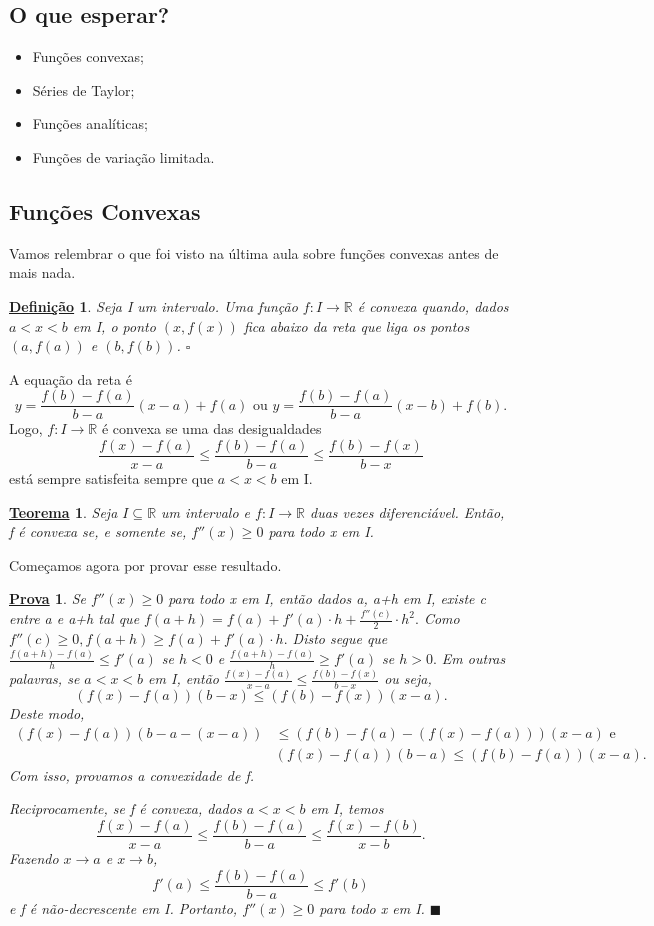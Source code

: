 \documentclass{article}
\newtheorem*{def*}{\underline{Defini\c c\~ao}}
\newtheorem*{theorem*}{\underline{Teorema}}
\newtheorem*{proof*}{\underline{Prova}}
\renewcommand\qedsymbol{$\blacksquare$}
\begin{document}
\subsection{O que esperar?}
\begin{itemize}
  \item Fun\c cões convexas;
  \item Séries de Taylor;
  \item Fun\c cões analíticas;
  \item Fun\c cões de varia\c cão limitada.
\end{itemize}
\subsection{Fun\c cões Convexas}
  Vamos relembrar o que foi visto na última aula sobre fun\c cões convexas antes de mais nada.
  \begin{def*}
  Seja I um intervalo. Uma fun\c cão \(f:I\rightarrow \mathbb{R}\) é convexa quando,
  dados \(a < x < b\) em I, o ponto \((x, f(x))\) fica abaixo da reta que
  liga os pontos \((a, f(a))\) e \((b, f(b))\). \(\square\)
\end{def*}
A equa\c cão da reta é 
  \[
    y = \frac{f(b)-f(a)}{b-a}(x-a)+f(a) \text{ ou } y = \frac{f(b)-f(a)}{b-a}(x-b)+f(b).
  \]
  Logo, \(f:I\rightarrow \mathbb{R}\) é convexa se uma das desigualdades 
    \[
      \frac{f(x) - f(a)}{x-a}\leq \frac{f(b) - f(a)}{b-a}\leq \frac{f(b)-f(x)}{b-x}
    \]
    está sempre satisfeita sempre que \(a < x < b\) em I. 
\begin{theorem*}
   Seja \(I\subseteq{\mathbb{R}}\) um intervalo e \(f:I\rightarrow \mathbb{R}\) duas vezes diferenciável.
   Então, f é convexa se, e somente se, \(f''(x)\geq 0\) para todo x em I.
 \end{theorem*}
 Come\c camos agora por provar esse resultado.
 \begin{proof*}
   Se \(f''(x)\geq 0\) para todo x em I, então dados a, a+h em I, existe
c entre a e a+h tal que \(f(a+h) = f(a) + f'(a)\cdot h + \frac{f''(c)}{2}\cdot h^{2}.\)
Como \(f''(c)\geq 0, f(a+h)\geq f(a) + f'(a)\cdot h.\) Disto segue que 
 \(\frac{f(a+h)-f(a)}{h}\leq f'(a)\) se \(h < 0\) e \(\frac{f(a+h)-f(a)}{h}\geq f'(a)\)
 se \(h > 0.\) Em outras palavras, se \(a < x < b\) em I, então \(\frac{f(x)-f(a)}{x-a}\leq \frac{f(b)-f(x)}{b-x}\)
 ou seja, 
   \[
     (f(x)-f(a))(b-x)\leq (f(b)-f(x))(x-a).
   \]
   Deste modo, 
  \begin{align*}
    (f(x)-f(a))(b-a-(x-a)) &\leq (f(b)-f(a)-(f(x)-f(a)))(x-a)\text{ e }\\
                           &(f(x)-f(a))(b-a)\leq (f(b)-f(a))(x-a).
  \end{align*}
  Com isso, provamos a convexidade de f.

  Reciprocamente, se f é convexa, dados \(a < x < b\) em I, temos 
    \[
      \frac{f(x)-f(a)}{x-a}\leq \frac{f(b)-f(a)}{b-a}\leq \frac{f(x) - f(b)}{x-b}.
    \]
  Fazendo \(x\rightarrow a\) e \(x\rightarrow b\), 
    \[
      f'(a)\leq \frac{f(b)-f(a)}{b-a}\leq f'(b)
    \]
  e f é não-decrescente em I. Portanto, \(f''(x)\geq 0\) para todo x em I. \qedsymbol
 \end{proof*}
\end{document}
